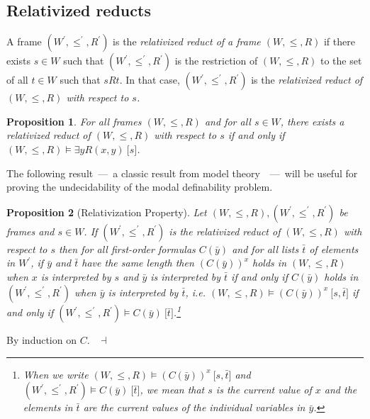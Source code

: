 \documentclass[draft]{article}
\newtheorem{proposition}{Proposition}
\newenvironment{proof}{{\bf Proof:}}{~$\dashv$\\}
\begin{document}
\subsection{Relativized reducts}
%
%
A frame $(W^{\prime},{\leq^{\prime}},{R^{\prime}})$ is the {\em relativized reduct of a frame $(W,{\leq},{R})$}\/ if there exists $s{\in}W$ such that $(W^{\prime},{\leq^{\prime}},{R^{\prime}})$ is the restriction of $(W,{\leq},{R})$ to the set of all $t{\in}W$ such that $s{R}t$.
In that case, $(W^{\prime},{\leq^{\prime}},{R^{\prime}})$ is the {\em relativized reduct of $(W,{\leq},{R})$ with respect to $s$.}
%
%
\begin{proposition}\label{Proposition:condition:suffisante:pour:existence:reduction}
%
%
For all frames $(W,{\leq},{R})$ and for all $s{\in}W$, there exists a relativized reduct of $(W,{\leq},{R})$ with respect to $s$ if and only if $(W,{\leq},{R}){\models}{\exists y}R(x,y)\ \lbrack s\rbrack$.
%
%
\end{proposition}
%
%
The following result~---~a classic result from model theory~\cite[Theorem $5.1.1$]{Hodges:1993}~---~will be useful for proving the undecidability of the modal definability problem.
%
%
\begin{proposition}[Relativization Property]\label{Syntactic:Restriction:Proposition}
%
%
Let $(W,{\leq},{R}),(W^{\prime},{\leq^{\prime}},{R^{\prime}})$ be frames and $s{\in}W$.
If $(W^{\prime},{\leq^{\prime}},{R^{\prime}})$ is the relativized reduct of $(W,{\leq},{R})$ with respect to $s$ then for all first-order formulas $C(\bar{y})$ and for all lists $\bar{t}$ of elements in $W^{\prime}$, if $\bar{y}$ and $\bar{t}$ have the same length then $(C(\bar{y}))^{x}$ holds in $(W,{\leq},{R})$ when $x$ is interpreted by $s$ and $\bar{y}$ is interpreted by $\bar{t}$ if and only if $C(\bar{y})$ holds in $(W^{\prime},{\leq^{\prime}},{R^{\prime}})$ when $\bar{y}$ is interpreted by $\bar{t}$, i.e. $(W,{\leq},{R}){\models}(C(\bar{y}))^{x}\ \lbrack s,\bar{t}\rbrack$ if and only if $(W^{\prime},{\leq^{\prime}},{R^{\prime}}){\models}C(\bar{y})\ \lbrack\bar{t}\rbrack$.\footnote{When we write $(W,{\leq},{R}){\models}(C(\bar{y}))^{x}\ \lbrack s,\bar{t}\rbrack$ and $(W^{\prime},{\leq^{\prime}},{R^{\prime}}){\models}C(\bar{y})\ \lbrack\bar{t}\rbrack$, we mean that $s$ is the current value of $x$ and the elements in $\bar{t}$ are the current values of the individual variables in $\bar{y}$.}
%
%
\end{proposition}
%
%
\begin{proof}
%
%
By induction on $C$.
%
%
\medskip
%
%
\end{proof}
%
%
%
%
\end{document}
